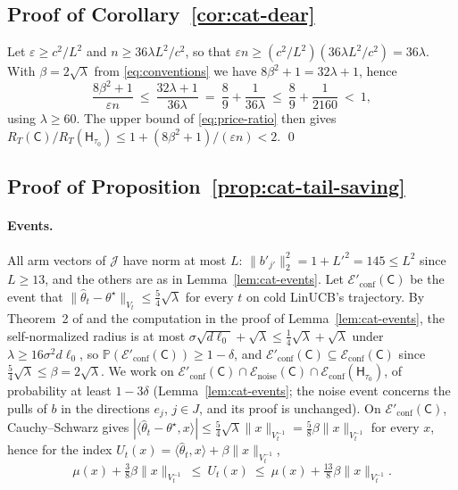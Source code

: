 \documentclass{article}
\theoremstyle{definition}
\theoremstyle{remark}
\newcommand{\Prb}{\mathbb{P}}
\newcommand{\eps}{\varepsilon}
\theoremstyle{remark}
\newcommand{\Cold}{\mathsf{C}}
\newcommand{\Hyb}{\mathsf{H}}
\begin{document}
\subsection{Proof of Corollary~\ref{cor:cat-dear}}

Let $\eps\ge c^2/L^2$ and $n\ge36\lambda L^2/c^2$, so that
$\eps n\ge(c^2/L^2)(36\lambda L^2/c^2)=36\lambda$. With $\beta=2\sqrt\lambda$
from \eqref{eq:conventions} we have $8\beta^2+1=32\lambda+1$, hence
\[
\frac{8\beta^2+1}{\eps n}\ \le\ \frac{32\lambda+1}{36\lambda}
\ =\ \frac89+\frac{1}{36\lambda}\ \le\ \frac89+\frac{1}{2160}\ <\ 1 ,
\]
using $\lambda\ge60$. The upper bound of \eqref{eq:price-ratio} then gives
$R_T(\Cold)/R_T(\Hyb_{\tau_0})\le1+(8\beta^2+1)/(\eps n)<2$. \qed

\subsection{Proof of Proposition~\ref{prop:cat-tail-saving}}
\label{app:proof-tail-saving}

\paragraph{Events.}
All arm vectors of $\mathcal J$ have norm at most $L$: $\|b'_{j'}\|_2^2=1+L'^2=145\le L^2$
since $L\ge13$, and the others are as in Lemma~\ref{lem:cat-events}. Let
$\mathcal E'_{\mathrm{conf}}(\Cold)$ be the event that
$\|\widehat\theta_t-\theta^\star\|_{V_t}\le\tfrac54\sqrt\lambda$ for every $t$
on cold LinUCB's trajectory. By Theorem~2 of \cite{abbasi2011improved} and
the computation in the proof of Lemma~\ref{lem:cat-events}, the
self-normalized radius is at most $\sigma\sqrt{d\ell_0}+\sqrt\lambda\le\tfrac14\sqrt\lambda+\sqrt\lambda$
under $\lambda\ge16\sigma^2d\ell_0$, so
$\Prb(\mathcal E'_{\mathrm{conf}}(\Cold))\ge1-\delta$, and
$\mathcal E'_{\mathrm{conf}}(\Cold)\subseteq\mathcal E_{\mathrm{conf}}(\Cold)$
since $\tfrac54\sqrt\lambda\le\beta=2\sqrt\lambda$. We work on
$\mathcal E'_{\mathrm{conf}}(\Cold)\cap\mathcal E_{\mathrm{noise}}(\Cold)\cap\mathcal E_{\mathrm{conf}}(\Hyb_{\tau_0})$,
of probability at least $1-3\delta$ (Lemma~\ref{lem:cat-events}; the noise
event concerns the pulls of $b$ in the directions $e_j$, $j\in J$, and its
proof is unchanged). On $\mathcal E'_{\mathrm{conf}}(\Cold)$, Cauchy--Schwarz
gives $|\langle\widehat\theta_t-\theta^\star,x\rangle|\le\tfrac54\sqrt\lambda\|x\|_{V_t^{-1}}=\tfrac58\beta\|x\|_{V_t^{-1}}$
for every $x$, hence for the index $U_t(x)=\langle\widehat\theta_t,x\rangle+\beta\|x\|_{V_t^{-1}}$,
\begin{equation}
\label{eq:sharp-index}
\mu(x)+\tfrac38\beta\|x\|_{V_t^{-1}}\ \le\ U_t(x)\ \le\ \mu(x)+\tfrac{13}8\beta\|x\|_{V_t^{-1}} .
\end{equation}
\end{document}
